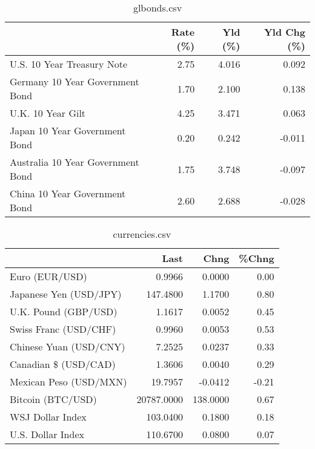 \documentclass{article}%
\begin{document}
%


\begin{table}[htbp]%
\caption{glbonds.csv}%
\centering%
\begin{adjustbox}{width=1\textwidth}%
\begin{tabular}{lrrr}
\toprule
                                  &  Rate (\%) &  Yld (\%) &  Yld Chg (\%) \\
\midrule
       U.S. 10 Year Treasury Note &      2.75 &    4.016 &        0.092 \\
  Germany 10 Year Government Bond &      1.70 &    2.100 &        0.138 \\
                U.K. 10 Year Gilt &      4.25 &    3.471 &        0.063 \\
    Japan 10 Year Government Bond &      0.20 &    0.242 &       -0.011 \\
Australia 10 Year Government Bond &      1.75 &    3.748 &       -0.097 \\
    China 10 Year Government Bond &      2.60 &    2.688 &       -0.028 \\
\bottomrule
\end{tabular}
%
\end{adjustbox}%
\end{table}

%


\begin{table}[htbp]%
\caption{currencies.csv}%
\centering%
\begin{adjustbox}{width=1\textwidth}%
\begin{tabular}{lrrr}
\toprule
                       &       Last &     Chng &  \%Chng \\
\midrule
        Euro (EUR/USD) &     0.9966 &   0.0000 &   0.00 \\
Japanese Yen (USD/JPY) &   147.4800 &   1.1700 &   0.80 \\
  U.K. Pound (GBP/USD) &     1.1617 &   0.0052 &   0.45 \\
 Swiss Franc (USD/CHF) &     0.9960 &   0.0053 &   0.53 \\
Chinese Yuan (USD/CNY) &     7.2525 &   0.0237 &   0.33 \\
  Canadian \$ (USD/CAD) &     1.3606 &   0.0040 &   0.29 \\
Mexican Peso (USD/MXN) &    19.7957 &  -0.0412 &  -0.21 \\
     Bitcoin (BTC/USD) & 20787.0000 & 138.0000 &   0.67 \\
      WSJ Dollar Index &   103.0400 &   0.1800 &   0.18 \\
     U.S. Dollar Index &   110.6700 &   0.0800 &   0.07 \\
\bottomrule
\end{tabular}
%
\end{adjustbox}%
\end{table}

%
\end{document}
